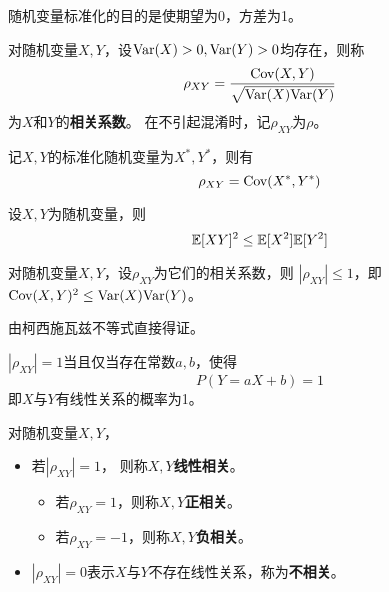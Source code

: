 \begin{remark}
  随机变量标准化的目的是使期望为0，方差为1。
\end{remark}

\begin{definition}[相关系数]
  对随机变量$X,Y$，设$\textrm{Var}(X)>0,\textrm{Var}(Y)>0$均存在，则称
  \begin{displaymath}
    \rho_{XY}=\frac{\textrm{Cov}(X,Y)}{\sqrt{\textrm{Var}(X)\textrm{Var}(Y)}}
  \end{displaymath}
  为$X$和$Y$的\textbf{相关系数}。
  在不引起混淆时，记$\rho_{XY}$为$\rho$。
\end{definition}

\begin{remark}
  记$X,Y$的标准化随机变量为$X^*,Y^*$，则有
  \begin{displaymath}
    \rho_{XY}=\textrm{Cov}(X^*,Y^*)
  \end{displaymath}
\end{remark}

\begin{theorem}
  设$X,Y$为随机变量，则
  \begin{displaymath}
    \mathbb{E}[XY]^2 \le \mathbb{E}[X^2]\mathbb{E}[Y^2]
  \end{displaymath}
\end{theorem}

\begin{theorem}[相关系数的性质]
  对随机变量$X,Y$，设$\rho_{XY}$为它们的相关系数，则
  $|\rho_{XY}|\le 1$，即$\textrm{Cov}(X,Y)^2 \le \textrm{Var}(X)\textrm{Var}(Y)$。
\end{theorem}

\begin{remark}
  由柯西施瓦兹不等式直接得证。
\end{remark}

\begin{theorem}
  $|\rho_{XY}|=1$当且仅当存在常数$a,b$，使得
  \[ P(Y=aX+b) = 1 \]
  即$X$与$Y$有线性关系的概率为1。
\end{theorem}

\begin{theorem}[相关性]
  对随机变量$X,Y$，
  \begin{itemize}
    \item
    若$|\rho_{XY}|=1$，
    则称$X,Y$\textbf{线性相关}。
    \begin{itemize}
      \item
      若$\rho_{XY}=1$，则称$X,Y$\textbf{正相关}。
      \item
      若$\rho_{XY}=-1$，则称$X,Y$\textbf{负相关}。
    \end{itemize}
    \item
    $|\rho_{XY}|=0$表示$X$与$Y$不存在线性关系，称为\textbf{不相关}。
  \end{itemize}
\end{theorem}

